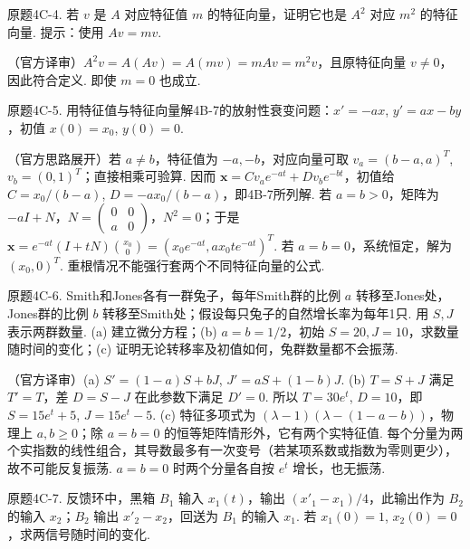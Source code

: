 \begin{exercise}\label{cw:bank-4C-4}原题4C-4. 若 $v$ 是 $A$ 对应特征值 $m$ 的特征向量，证明它也是 $A^2$ 对应 $m^2$ 的特征向量. 提示：使用 $Av=mv$.\end{exercise}
\begin{solution}（官方译审）$A^2v=A(Av)=A(mv)=mAv=m^2v$，且原特征向量 $v\ne0$，因此符合定义. 即使 $m=0$ 也成立.\end{solution}
\begin{exercise}\label{cw:bank-4C-5}原题4C-5. 用特征值与特征向量解4B-7的放射性衰变问题：$x'=-ax$, $y'=ax-by$，初值 $x(0)=x_0$, $y(0)=0$.\end{exercise}
\begin{solution}（官方思路展开）若 $a\ne b$，特征值为 $-a,-b$，对应向量可取 $v_a=(b-a,a)^T$, $v_b=(0,1)^T$；直接相乘可验算. 因而 $\mathbf x=Cv_ae^{-at}+Dv_be^{-bt}$，初值给 $C=x_0/(b-a)$, $D=-ax_0/(b-a)$，即4B-7所列解. 若 $a=b>0$，矩阵为 $-aI+N$，$N=\begin{pmatrix}0&0\\a&0\end{pmatrix}$，$N^2=0$；于是 $\mathbf x=e^{-at}(I+tN)\binom{x_0}0=(x_0e^{-at},ax_0te^{-at})^T$. 若 $a=b=0$，系统恒定，解为 $(x_0,0)^T$. 重根情况不能强行套两个不同特征向量的公式.\end{solution}
\begin{exercise}\label{cw:bank-4C-6}原题4C-6. Smith和Jones各有一群兔子，每年Smith群的比例 $a$ 转移至Jones处，Jones群的比例 $b$ 转移至Smith处；假设每只兔子的自然增长率为每年1只. 用 $S,J$ 表示两群数量. (a) 建立微分方程；(b) $a=b=1/2$，初始 $S=20,J=10$，求数量随时间的变化；(c) 证明无论转移率及初值如何，兔群数量都不会振荡.\end{exercise}
\begin{solution}（官方译审）(a) $S'=(1-a)S+bJ$, $J'=aS+(1-b)J$. (b) $T=S+J$ 满足 $T'=T$，差 $D=S-J$ 在此参数下满足 $D'=0$. 所以 $T=30e^t$, $D=10$，即 $S=15e^t+5$, $J=15e^t-5$. (c) 特征多项式为 $(\lambda-1)(\lambda-(1-a-b))$，物理上 $a,b\ge0$；除 $a=b=0$ 的恒等矩阵情形外，它有两个实特征值. 每个分量为两个实指数的线性组合，其导数最多有一次变号（若某项系数或指数为零则更少），故不可能反复振荡. $a=b=0$ 时两个分量各自按 $e^t$ 增长，也无振荡.\end{solution}
\begin{exercise}\label{cw:bank-4C-7}原题4C-7. 反馈环中，黑箱 $B_1$ 输入 $x_1(t)$，输出 $(x'_1-x_1)/4$，此输出作为 $B_2$ 的输入 $x_2$；$B_2$ 输出 $x'_2-x_2$，回送为 $B_1$ 的输入 $x_1$. 若 $x_1(0)=1$, $x_2(0)=0$，求两信号随时间的变化.\end{exercise}
